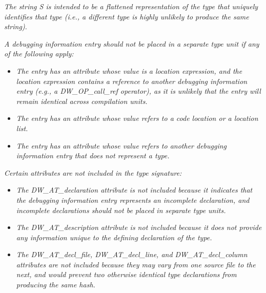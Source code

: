 \textit{The string S is intended to be a flattened representation of
the type that uniquely identifies that type (i.e., a different
type is highly unlikely to produce the same string).}

\textit{A debugging information entry should not be placed in a
separate type unit if any of the following apply:}

\begin{itemize}

\item \textit{The entry has an attribute whose value is a location
expression, and the location expression contains a reference to
another debugging information entry (e.g., a DW\_OP\_call\_ref
operator), as it is unlikely that the entry will remain
identical across compilation units.}

\item \textit{The entry has an attribute whose value refers
to a code location or a location list.}

\item \textit{The entry has an attribute whose value refers
to another debugging information entry that does not represent
a type.}
\end{itemize}


\textit{Certain attributes are not included in the type signature:}

\begin{itemize}
\item \textit{The DW\_AT\_declaration attribute is not included because it
indicates that the debugging information entry represents an
incomplete declaration, and incomplete declarations should
not be placed in separate type units.}

\item \textit{The DW\_AT\_description attribute is not included because
it does not provide any information unique to the defining
declaration of the type.}

\item \textit{The DW\_AT\_decl\_file, DW\_AT\_decl\_line, and
DW\_AT\_decl\_column attributes are not included because they
may vary from one source file to the next, and would prevent
two otherwise identical type declarations from producing the
same hash.}

\end{itemize}
